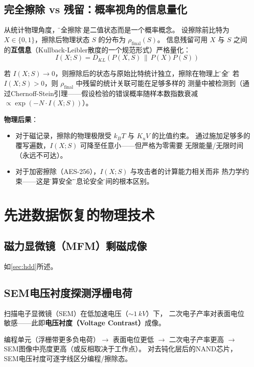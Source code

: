 \documentclass[11pt,a4paper,twoside]{article}
\theoremstyle{definition}\newtheorem{definition}{定义}[section]
\theoremstyle{plain}\newtheorem{theorem}{定理}[section]
\theoremstyle{remark}\newtheorem{remark}{注解}[section]
\begin{document}
\subsection{完全擦除 vs 残留：概率视角的信息量化}

从统计物理角度，\"完全擦除\"不是二值状态而是一个概率概念。
设擦除前比特为 $X \in \{0,1\}$，擦除后物理状态 $S$ 的分布为
$\rho_{\text{final}}(S)$。
信息残留可用 $X$ 与 $S$ 之间的\textbf{互信息}（Kullback-Leibler散度的一个规范形式）严格量化：
\begin{equation}\label{eq:kl}
  I(X; S) = D_{KL}\!\left( P(X,S) \,\|\, P(X)P(S) \right)
\end{equation}

若 $I(X;S) \to 0$，则擦除后的状态与原始比特统计独立，擦除在物理上\"完全\"。
若 $I(X;S) > 0$，则 $\rho_{\text{final}}$ 中残留的统计关联可能在足够多样的
测量中被检测到（通过Chernoff-Stein引理——假设检验的错误概率随样本数指数衰减
$\propto \exp(-N \cdot I(X;S))$）。

\textbf{物理后果}：
\begin{itemize}
  \item 对于磁记录，擦除的物理极限受 $k_B T$ 与 $K_u V$ 的比值约束。
  通过施加足够多的覆写遍数，$I(X;S)$ 可降至任意小——但严格为零需要
  无限能量/无限时间（永远不可达）。
  \item 对于加密擦除（AES-256），$I(X;S)$ 与攻击者的计算能力相关而非
  热力学约束——这是\"计算安全\"与\"信息论安全\"之间的根本区别。
\end{itemize}

\section{先进数据恢复的物理技术}
\label{sec:recovery-tech}

\subsection{磁力显微镜（MFM）剩磁成像} 如\cref{sec:hdd}所述。

\subsection{SEM电压衬度探测浮栅电荷}

扫描电子显微镜（SEM）在低加速电压（$\sim \SI{1}{kV}$）下，
二次电子产率对表面电位敏感——此即\textbf{电压衬度（Voltage Contrast）}成像。

编程单元（浮栅带更多负电荷）$\to$ 表面电位更低 $\to$
二次电子产率更高 $\to$ SEM图像中亮度更高（或反相取决于工作点）。
对去钝化层后的NAND芯片，SEM电压衬度可逐字线区分编程/擦除态。
\end{document}
